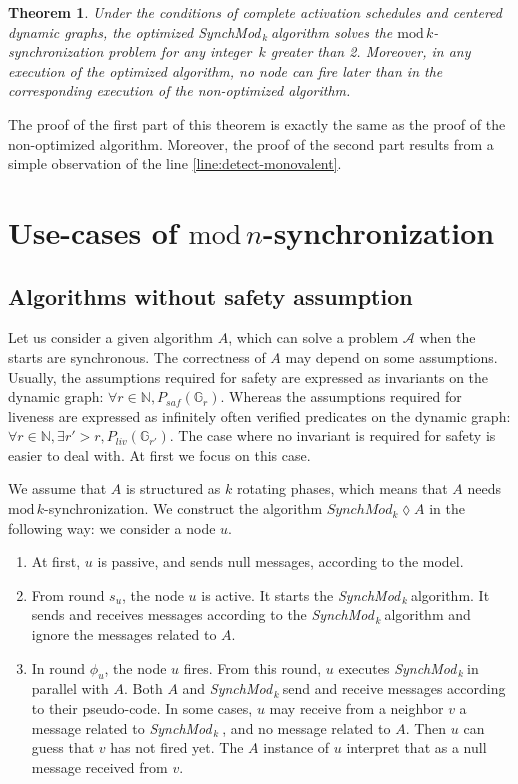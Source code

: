 \documentclass{article}
\newtheorem{theorem}{Theorem}
\newcommand{\tf}{\phi}
\newcommand{\SM}{{\em SynchMod}$_{\,k}\ $}
\begin{document}
\begin{theorem}
Under the conditions of complete activation schedules and centered dynamic graphs,
	the optimized \SM algorithm solves the $\mathrm{mod}\,k$-synchronization problem for any integer~$k$ greater than 2.
	Moreover, in any execution of the optimized algorithm, no node can fire later than in the corresponding execution of the non-optimized algorithm.
\end{theorem}

The proof of the first part of this theorem is exactly the same as the proof of the non-optimized algorithm.
Moreover, the proof of the second part results from a simple observation of the line \ref{line:detect-monovalent}.

\section{Use-cases of $\mathrm{mod}\,n$-synchronization}

\subsection{Algorithms without safety assumption}

Let us consider a given algorithm $A$, which can solve a problem $\mathcal{A}$ when the starts are synchronous.
The correctness of $A$ may depend on some assumptions.
Usually, the assumptions required for safety are expressed as invariants on the dynamic graph: $\forall r \in \mathds{N}, P_{saf}(\mathds{G}_r)$.
Whereas the assumptions required for liveness are expressed as infinitely often verified predicates on the dynamic graph: $\forall r \in \mathds{N}, \exists r' > r, P_{liv}(\mathds{G}_{r'})$.
The case where no invariant is required for safety is easier to deal with. At first we focus on this case.

We assume that $A$ is structured as $k$ rotating phases, which means that $A$ needs $\mathrm{mod}\,k$-synchronization.
We construct the algorithm $SynchMod_k \lozenge A$ in the following way:
we consider a node $u$. 
\begin{enumerate}
	\item At first, $u$ is passive, and sends null messages, according to the model.
	\item From round $s_u$, the node $u$ is active. It starts the \SM algorithm. It sends and receives messages according to the \SM algorithm and ignore the messages related to $A$.
	\item In round $\tf_u$, the node $u$ fires. From this round, $u$ executes \SM in parallel with $A$. Both $A$ and \SM send and receive messages according to their pseudo-code.
		In some cases, $u$ may receive from a neighbor $v$ a message related to \SM, and no message related to $A$. Then $u$ can guess that $v$ has not fired yet.
		The $A$ instance of $u$ interpret that as a null message received from $v$.
\end{enumerate}
\end{document}
